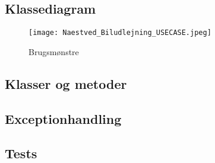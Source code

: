 \documentclass[11pt]{article}
\begin{document}
\subsection*{Klassediagram}

\begin{figure}
  \centering
  \texttt{[image: Naestved\_Biludlejning\_USECASE.jpeg]}
  \caption{Brugsmønstre}
  \label{fig:Use-case diagram}
\end{figure}

\subsection*{Klasser og metoder}

\subsection*{Exceptionhandling}

\subsection*{Tests}
\end{document}
